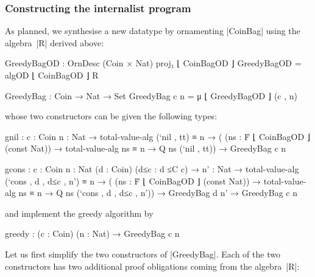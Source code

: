 \subsubsection{Constructing the internalist program}

As planned, we synthesise a new datatype by ornamenting |CoinBag| using the algebra~|R| derived above:
\begin{code}
GreedyBagOD : OrnDesc (Coin × Nat) proj₁ ⌊ CoinBagOD ⌋
GreedyBagOD = algOD ⌊ CoinBagOD ⌋ R

GreedyBag : Coin → Nat → Set
GreedyBag c n = μ ⌊ GreedyBagOD ⌋ (c , n)
\end{code}
whose two constructors can be given the following types:
\begin{code}
gnil   :  {c : Coin} {n : Nat} →
          total-value-alg (`nil , tt) ≡ n →
          (  (ns : Ḟ ⌊ CoinBagOD ⌋ (const Nat)) →
               total-value-alg ns ≡ n → Q ns (`nil , tt)) →
          GreedyBag c n

gcons  :  {c : Coin} {n : Nat} (d : Coin) (d≤c : d ≤C c) →
          {n' : Nat} → total-value-alg (`cons , d , d≤c , n') ≡ n →
          (  (ns : Ḟ ⌊ CoinBagOD ⌋ (const Nat)) →
               total-value-alg ns ≡ n → Q ns (`cons , d , d≤c , n')) →
          GreedyBag d n' → GreedyBag c n
\end{code}
and implement the greedy algorithm by
\begin{code}
greedy : (c : Coin) (n : Nat) → GreedyBag c n
\end{code}
Let us first simplify the two constructors of |GreedyBag|.
Each of the two constructors has two additional proof obligations coming from the algebra~|R|:
